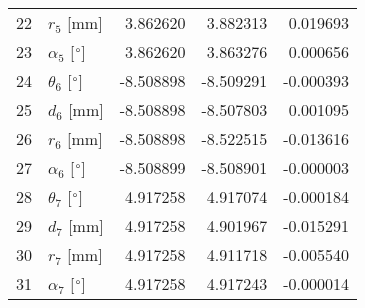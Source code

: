 \documentclass{standalone}%
\begin{document}
\begin{tabular}{llrrr}
22 &              $r_{5}$ [mm] &  3.862620 &   3.882313 &   0.019693 \\
23 &  $\alpha_{5}$ [$\degree$] &  3.862620 &   3.863276 &   0.000656 \\
24 &  $\theta_{6}$ [$\degree$] & -8.508898 &  -8.509291 &  -0.000393 \\
25 &              $d_{6}$ [mm] & -8.508898 &  -8.507803 &   0.001095 \\
26 &              $r_{6}$ [mm] & -8.508898 &  -8.522515 &  -0.013616 \\
27 &  $\alpha_{6}$ [$\degree$] & -8.508899 &  -8.508901 &  -0.000003 \\
28 &  $\theta_{7}$ [$\degree$] &  4.917258 &   4.917074 &  -0.000184 \\
29 &              $d_{7}$ [mm] &  4.917258 &   4.901967 &  -0.015291 \\
30 &              $r_{7}$ [mm] &  4.917258 &   4.911718 &  -0.005540 \\
31 &  $\alpha_{7}$ [$\degree$] &  4.917258 &   4.917243 &  -0.000014 \\
\bottomrule
\end{tabular}
%
\end{document}
